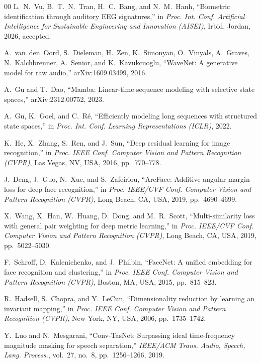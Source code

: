 \documentclass{IEEEtran}
\begin{document}
\begin{thebibliography}{00}
 L.~N.~Vu, B.~T.~N.~Tran, H.~C.~Bang, and N.~M.~Hanh,
``Biometric identification through auditory EEG signatures,'' in
\emph{Proc. Int. Conf. Artificial Intelligence for Sustainable
Engineering and Innovation (AISEI)}, Irbid, Jordan, 2026, accepted.

 A.~van~den~Oord, S.~Dieleman, H.~Zen, K.~Simonyan,
O.~Vinyals, A.~Graves, N.~Kalchbrenner, A.~Senior, and K.~Kavukcuoglu,
``WaveNet: A generative model for raw audio,'' arXiv:1609.03499, 2016.

 A.~Gu and T.~Dao, ``Mamba: Linear-time sequence modeling
with selective state spaces,'' arXiv:2312.00752, 2023.

 A.~Gu, K.~Goel, and C.~R{\'e}, ``Efficiently modeling long
sequences with structured state spaces,'' in \emph{Proc. Int. Conf.
Learning Representations (ICLR)}, 2022.

 K.~He, X.~Zhang, S.~Ren, and J.~Sun, ``Deep residual
learning for image recognition,'' in \emph{Proc. IEEE Conf. Computer
Vision and Pattern Recognition (CVPR)}, Las Vegas, NV, USA, 2016,
pp.~770--778.

 J.~Deng, J.~Guo, N.~Xue, and S.~Zafeiriou, ``ArcFace:
Additive angular margin loss for deep face recognition,'' in
\emph{Proc. IEEE/CVF Conf. Computer Vision and Pattern Recognition
(CVPR)}, Long Beach, CA, USA, 2019, pp.~4690--4699.

 X.~Wang, X.~Han, W.~Huang, D.~Dong, and M.~R.~Scott,
``Multi-similarity loss with general pair weighting for deep metric
learning,'' in \emph{Proc. IEEE/CVF Conf. Computer Vision and Pattern
Recognition (CVPR)}, Long Beach, CA, USA, 2019, pp.~5022--5030.

 F.~Schroff, D.~Kalenichenko, and J.~Philbin, ``FaceNet: A
unified embedding for face recognition and clustering,'' in
\emph{Proc. IEEE Conf. Computer Vision and Pattern Recognition (CVPR)},
Boston, MA, USA, 2015, pp.~815--823.

 R.~Hadsell, S.~Chopra, and Y.~LeCun, ``Dimensionality
reduction by learning an invariant mapping,'' in \emph{Proc. IEEE Conf.
Computer Vision and Pattern Recognition (CVPR)}, New York, NY, USA,
2006, pp.~1735--1742.

 Y.~Luo and N.~Mesgarani, ``Conv-TasNet: Surpassing ideal
time-frequency magnitude masking for speech separation,''
\emph{IEEE/ACM Trans. Audio, Speech, Lang. Process.}, vol.~27, no.~8,
pp.~1256--1266, 2019.


\end{thebibliography}
\end{document}
